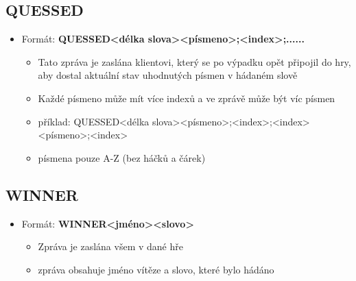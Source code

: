 \documentclass[12pt]{report}
\begin{document}
		\subsection{QUESSED}
			\begin{itemize}
				\item Formát: \textbf{QUESSED{\textbar}{\textless}délka slova{\textgreater}{\textbar}{\textless}písmeno{\textgreater};{\textless}index{\textgreater};...{\textbar}...}
				\begin{itemize}
					\item Tato zpráva je zaslána klientovi, který se po výpadku opět připojil do hry, aby dostal aktuální stav uhodnutých písmen v hádaném slově
					\item Každé písmeno může mít více indexů a ve zprávě může být víc písmen
					\item příklad: QUESSED{\textbar}{\textless}délka slova{\textgreater}{\textbar}{\textless}písmeno{\textgreater};{\textless}index{\textgreater};{\textless}index{\textgreater}{\textbar}{\textless}písmeno{\textgreater};{\textless}index{\textgreater}
					\item písmena pouze A-Z (bez háčků a čárek)
				\end{itemize}
			\end{itemize}
		\subsection{WINNER}
			\begin{itemize}
				\item Formát: \textbf{WINNER{\textbar}{\textless}jméno{\textgreater}{\textbar}{\textless}slovo{\textgreater}}
				\begin{itemize}
					\item Zpráva je zaslána všem v dané hře
					\item zpráva obsahuje jméno vítěze a slovo, které bylo hádáno
				\end{itemize}
			\end{itemize}
		
		\newpage
		
\end{document}
